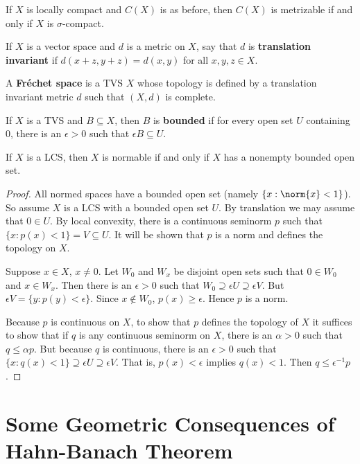 \begin{eg}
    If $X$ is locally compact and $C(X)$ is as before, then $C(X)$ is metrizable if and only if $X$ is $\sigma$-compact.
\end{eg}

If $X$ is a vector space and $d$ is a metric on $X$, say that $d$ is \textbf{translation invariant} if $d(x+z,y+z) = d(x,y)$ for all $x,y,z \in X$.

\begin{defn}
    A \textbf{Fr\'{e}chet space} is a TVS $X$ whose topology is defined by a translation invariant metric $d$ such that $(X,d)$ is complete.
\end{defn}

\begin{defn}
    If $X$ is a TVS and $B \subseteq X$, then $B$ is \textbf{bounded} if for every open set $U$ containing $0$, there is an $\epsilon > 0$ such that $\epsilon B \subseteq U$.
\end{defn}


\begin{prop}
    If $X$ is a LCS, then $X$ is normable if and only if $X$ has a nonempty bounded open set.
\end{prop}
\begin{proof}
    All normed spaces have a bounded open set (namely $\{x:\norm{x} < 1\}$). So assume $X$ is a LCS with a bounded open set $U$. By translation we may assume that $0 \in U$. By local convexity, there is a continuous seminorm $p$ such that $\{x:p(x) < 1\}= V \subseteq U$. It will be shown that $p$ is a norm and defines the topology on $X$.

    Suppose $x \in X$, $x \neq 0$. Let $W_0$ and $W_x$ be disjoint open sets such that $0 \in W_0$ and $x \in W_x$. Then there is an $\epsilon > 0$ such that $W_0 \supseteq \epsilon U\supseteq \epsilon V$. But $\epsilon V =\{y:p(y) < \epsilon\}$. Since $x \notin W_0$, $p(x) \geq \epsilon$. Hence $p$ is a norm.

    Because $p$ is continuous on $X$, to show that $p$ defines the topology of $X$ it suffices to show that if $q$ is any continuous seminorm on $X$, there is an $\alpha > 0$ such that $q\leq \alpha p$. But because $q$ is continuous, there is an $\epsilon > 0$ such that $\{x:q(x) < 1\} \supseteq \epsilon U\supseteq \epsilon V$. That is, $p(x) < \epsilon$ implies $q(x) < 1$. Then $q\leq \epsilon^{-1}p$.
\end{proof}


\section{Some Geometric Consequences of Hahn-Banach Theorem}
\label{sec:consHahn}



